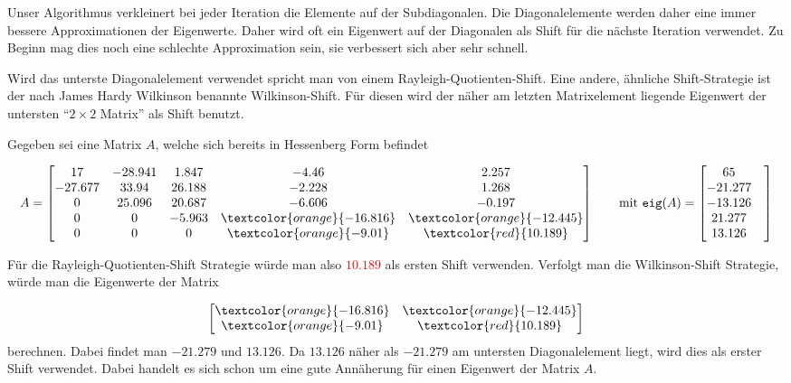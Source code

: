 Unser Algorithmus verkleinert bei jeder Iteration die Elemente auf der Subdiagonalen.
Die Diagonalelemente werden daher eine immer bessere Approximationen der Eigenwerte.
Daher wird oft ein Eigenwert auf der Diagonalen als Shift für die nächste Iteration verwendet.
Zu Beginn mag dies noch eine schlechte Approximation sein, sie verbessert sich aber sehr schnell.

Wird das unterste Diagonalelement verwendet spricht man von einem Rayleigh-Quotienten-Shift.
%
%
Eine andere, ähnliche Shift-Strategie ist der nach James Hardy Wilkinson benannte Wilkinson-Shift.
%
%
%
%
Für diesen wird der näher am letzten Matrixelement liegende Eigenwert der untersten "`$2\times2$ Matrix"' als Shift benutzt.


\begin{beispiel}
	Gegeben sei eine Matrix $A$, welche sich bereits in Hessenberg Form befindet
	
	\begin{equation}
	A=
	\begin{bmatrix}
	17 & -28.941 & 1.847 & -4.46 & 2.257\\
	-27.677 & 33.94 & 26.188 & -2.228 & 1.268\\
	0 & 25.096 & 20.687 & -6.606 & -0.197\\
	0 & 0 & -5.963 & \textcolor{orange}{-16.816} & \textcolor{orange}{-12.445}\\
	0 & 0 & 0 & \textcolor{orange}{-9.01} & \textcolor{red}{10.189}\\
	\end{bmatrix} 
	\qquad
	\text{mit }
	\texttt{eig}(A)=
	\begin{bmatrix}
	65 & \\
	-21.277 & \\
	-13.126 & \\
	21.277 & \\
	13.126 & \\
	\end{bmatrix}
	\end{equation}
	
	Für die Rayleigh-Quotienten-Shift Strategie würde man also \textcolor{red}{$10.189$} als ersten Shift verwenden.
	Verfolgt man die Wilkinson-Shift Strategie, würde man die Eigenwerte der Matrix

	\begin{equation}
	\begin{bmatrix}
	 \textcolor{orange}{-16.816} & \textcolor{orange}{-12.445}\\
	 \textcolor{orange}{-9.01} & \textcolor{red}{10.189}\\
	\end{bmatrix}
	\end{equation}
	berechnen.
	Dabei findet man $-21.279$ und $13.126$.
	Da $13.126$ näher als $-21.279$ am untersten Diagonalelement liegt, wird dies als erster Shift verwendet.
	Dabei handelt es sich schon um eine gute Annäherung für einen Eigenwert der Matrix $A$.	
\end{beispiel}


